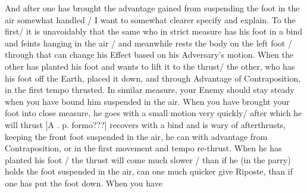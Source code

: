 And after one has brought the advantage gained from suspending the
foot in the air somewhat handled / I want to somewhat clearer specify
and explain. To the first/ it is unavoidably that the same who in strict
measure has his foot in a bind and feints hanging in the air / and
meanwhile rests the body on the left foot / through that can change
his Effect based on his Adversary's motion.
When the other has planted his foot and wants to lift it to the
thrust/ the other, who has his foot off the Earth, placed it down, and
through Advantage of Contraposition, in the first tempo thrusted. In
similar measure, your Enemy should stay steady when you have bound him
suspended in the air.
When you have brought your foot into close measure, he goes with a
small motion very quickly/ after which he will thrust [A
. p. formo???] recovers with a bind and is wary of afterthrusts,
keeping the front foot suspended in the air, he can with advantage
from Contraposition, or in the first movement and tempo re-thrust.
When he has planted his foot / the thrust will come much slower / than
if he (in the parry) holds the foot suspended in the air, can one much
quicker give Riposte, than if one has put the foot down. When you have
